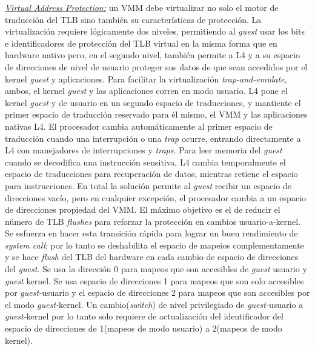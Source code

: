 \underline{\emph{Virtual Address Protection:}} un VMM debe virtualizar no solo el motor de traducción del TLB sino también su características de protección. La virtualización requiere lógicamente dos niveles, permitiendo al \emph{guest} usar los bits e identificadores de protección del TLB virtual en la misma forma que en hardware nativo pero, en el segundo nivel, también permite a L4 y a su espacio de direcciones de nivel de usuario proteger sus datos de que sean accedidos por el kernel \emph{guest} y aplicaciones. Para facilitar la virtualización \emph{trap-and-emulate}, ambos, el kernel \emph{guest} y las aplicaciones corren en modo usuario. L4 pone el kernel \emph{guest} y de usuario en un segundo espacio de traducciones, y mantiente el primer espacio de traducción reservado para él mismo, el VMM y las aplicaciones nativas L4. El procesador cambia automáticamente al primer espacio de traducción cuando una interrupción o una \emph{trap} ocurre, entrando directamente a L4 con manejadores de interrupciones y \emph{traps}. Para leer memoria del \emph{guest} cuando se decodifica una instrucción sensitiva, L4 cambia temporalmente el espacio de traducciones para recuperación de datos, mientras retiene el espacio para instrucciones. En total la solución permite al \emph{guest} recibir un espacio de direcciones vacío, pero en cualquier excepción, el procesador cambia a un espacio de direcciones propiedad del VMM. El máximo objetivo es el de reducir el número de TLB \emph{flushes} para reforzar la protección en cambios usuario-a-kernel. Se esfuerza en hacer esta transición rápida para lograr un buen rendimiento de \emph{system call}; por lo tanto se deshabilita el espacio de mapeios complementamente y se hace \emph{flush} del TLB del hardware en cada cambio de espacio de direcciones del \emph{guest}. Se usa la dirección 0 para mapeos que son accesibles de \emph{guest} usuario y \emph{guest} kernel. Se usa espacio de direcciones 1 para mapeos que son solo accesibles por \emph{guest-}usuario y el espacio de direcciones 2 para mapeos que son accesibles por el modo \emph{guest-}kernel. Un cambio(\emph{switch}) de nivel privilegiado de \emph{guest-}usuario a \emph{guest-}kernel por lo tanto solo requiere de actualización del identificador del espacio de direcciones de 1(mapeos de modo usuario) a 2(mapeos de modo kernel). 

